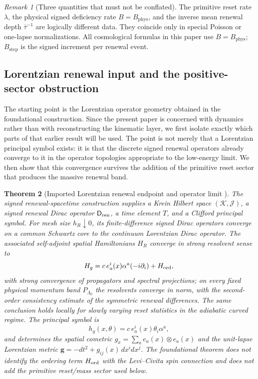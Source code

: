\documentclass[11pt]{article}
\newtheorem{theorem}{Theorem}[section]
\theoremstyle{definition}
\theoremstyle{remark}
\newtheorem{remark}[theorem]{Remark}
\newcommand{\K}{\mathcal K}
\newcommand{\J}{\mathcal J}
\newcommand{\Dirac}{\mathsf D}
\newcommand{\Bstep}{B_{\mathrm{step}}}
\newcommand{\Bphys}{B_{\mathrm{phys}}}
\newcommand{\bartau}{\bar\tau}
\begin{document}
\begin{remark}[Three quantities that must not be conflated]
\label{rem:three-renewal-rates}
The primitive reset rate \(\lambda\), the physical signed deficiency rate
\(B=\Bphys\), and the inverse mean renewal depth \(\bartau^{-1}\) are logically
different data.  They coincide only in special Poisson or one-lapse
normalizations.  All cosmological formulas in this paper use \(B=\Bphys\);
\(\Bstep\) is the signed increment per renewal event.
\end{remark}



\subsection{Lorentzian renewal input and the positive-sector obstruction}

The starting point is the Lorentzian operator geometry obtained in the
foundational construction.  Since the present paper is concerned with dynamics
rather than with reconstructing the kinematic layer, we first isolate exactly
which parts of that earlier result will be used.  The point is not merely that a
Lorentzian principal symbol exists: it is that the discrete signed renewal
operators already converge to it in the operator topologies appropriate to the
low-energy limit.  We then show that this convergence survives the addition of
the primitive reset sector that produces the massive renewal band.

\begin{theorem}[Imported Lorentzian renewal endpoint and operator limit
\cite{PelissierLorentzian}]
\label{thm:imported-lorentzian}
The signed renewal-spacetime construction supplies a Krein Hilbert space
$(\K,\J)$, a signed renewal Dirac operator $\Dirac_{\rm ren}$, a time element
$T$, and a Clifford principal symbol.  For mesh size $h_R\downarrow0$, its
finite-difference signed Dirac operators converge on a common Schwartz core to
the continuum Lorentzian Dirac operator.  The associated self-adjoint spatial
Hamiltonians $H_R$ converge in strong resolvent sense to
\[
 H_g=c\,e_a^i(x)\alpha^a(-i\partial_i)+H_{\rm ord},
\]
with strong convergence of propagators and spectral projections; on every fixed
physical momentum band $P_{\Lambda_0}$ the resolvents converge in norm, with the
second-order consistency estimate of the symmetric renewal differences.  The
same conclusion holds locally for slowly varying reset statistics in the
adiabatic curved regime.  The principal symbol is
\[
        h_g(x,\theta)=c\,e_a^i(x)\theta_i\alpha^a,
\]
and determines the spatial cometric
$g_x=\sum_a e_a(x)\otimes e_a(x)$ and the unit-lapse Lorentzian metric
$\mathbf g=-dt^2+g_{ij}(x)\,dx^idx^j$.  The foundational theorem does not
identify the ordering term $H_{\rm ord}$ with the Levi--Civita spin connection
and does not add the primitive reset/mass sector used below.
\end{theorem}
\end{document}

